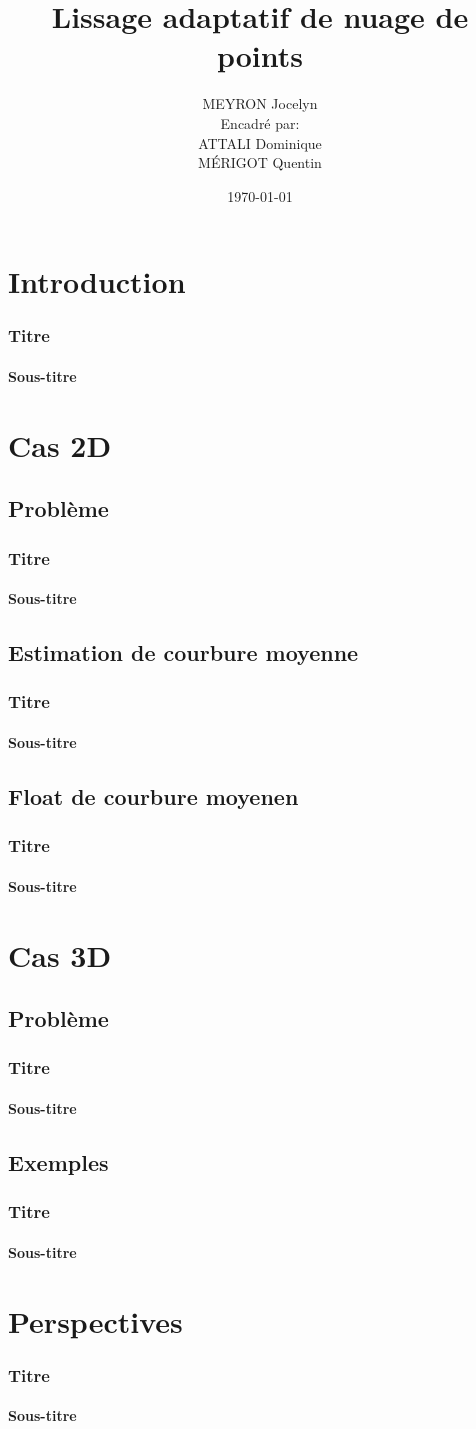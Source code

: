 \documentclass{beamer}
\title[Lissage adaptatif de nuage de points]{Lissage adaptatif de nuage de
    points}
\author[MEYRON Jocelyn]{MEYRON Jocelyn\\\scriptsize{Encadré par:\\ATTALI Dominique\\MÉRIGOT
    Quentin}}
\institute{GIPSA-lab}
\date{\today}
\begin{document}
\begin{frame}
    \titlepage
\end{frame}

\begin{frame}
    \tableofcontents
\end{frame}

\section{Introduction}

\begin{frame}
    \frametitle{Titre}
    \framesubtitle{Sous-titre}
\end{frame}

\section{Cas 2D}

\subsection{Problème}
\begin{frame}
    \frametitle{Titre}
    \framesubtitle{Sous-titre}
\end{frame}

\subsection{Estimation de courbure moyenne}
\begin{frame}
    \frametitle{Titre}
    \framesubtitle{Sous-titre}
\end{frame}

\subsection{Float de courbure moyenen}
\begin{frame}
    \frametitle{Titre}
    \framesubtitle{Sous-titre}
\end{frame}

\section{Cas 3D}

\subsection{Problème}
\begin{frame}
    \frametitle{Titre}
    \framesubtitle{Sous-titre}
\end{frame}

\subsection{Exemples}
\begin{frame}
    \frametitle{Titre}
    \framesubtitle{Sous-titre}
\end{frame}

\section{Perspectives}

\begin{frame}
    \frametitle{Titre}
    \framesubtitle{Sous-titre}
\end{frame}
\end{document}
